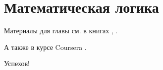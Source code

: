 \chapter{Математическая логика}

Материалы для главы см. в книгах \cite{galiev2002}, \cite{kolmogorov2006}.

А также в курсе Coursera \cite{coursera:logic-introduction}.

Успехов!
